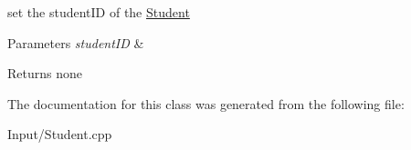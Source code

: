 set the student\+ID of the \hyperlink{classStudent}{Student}


\begin{DoxyParams}{Parameters}
{\em student\+ID} & \\
\hline
\end{DoxyParams}
\begin{DoxyReturn}{Returns}
none 
\end{DoxyReturn}


The documentation for this class was generated from the following file\+:\begin{DoxyCompactItemize}
\item 
Input/Student.\+cpp\end{DoxyCompactItemize}
